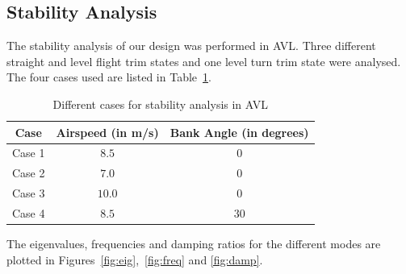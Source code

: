 \documentclass[11pt]{article}
\begin{document}
    \subsection{Stability Analysis}

    The stability analysis of our design was performed in AVL. Three different straight and level flight trim states and one level turn trim state were analysed. The four cases used are listed in Table~\ref{table:stab-cases}.

    \begin{table}[htb]
    	\begin{center}
    		\begin{tabular}{|c|c|c|}
    			\hline
    			\textbf{Case} & \textbf{Airspeed (in m/s)} & \textbf{Bank Angle (in degrees)} \\ 
    			\hline
    			Case 1 &  $8.5$ &  $0$ \\
    			Case 2 &  $7.0$ &  $0$ \\
    			Case 3 & $10.0$ &  $0$ \\
    			Case 4 &  $8.5$ & $30$ \\
    			\hline
    		\end{tabular}
    	\end{center}
    	\caption{Different cases for stability analysis in AVL}
    	\label{table:stab-cases} 
    \end{table}

    The eigenvalues, frequencies and damping ratios for the different modes are plotted in Figures~\ref{fig:eig},~\ref{fig:freq} and \ref{fig:damp}.
\end{document}
